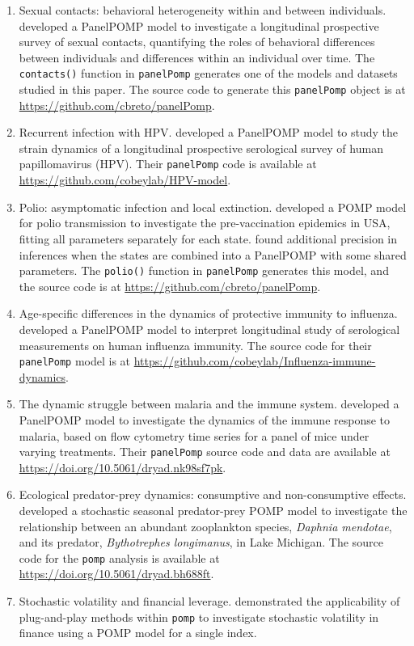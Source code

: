 \documentclass[12pt]{article}\usepackage[]{graphicx}\usepackage[table]{xcolor}
\newcommand\code{\texttt}
\newcommand\panelPomp{\texttt{panelPomp}\xspace}
\newcommand\pomp{\texttt{pomp}\xspace}
\newcommand\example[1]{ \item #1}
\begin{document}
\begin{enumerate}
\example{Sexual contacts: behavioral heterogeneity within and between individuals}.
\citet{romero-severson15} developed a PanelPOMP model to investigate a longitudinal prospective survey of sexual contacts, quantifying the roles of behavioral differences between individuals and differences within an individual over time. The \code{contacts()} function in \panelPomp generates one of the models and datasets studied in this paper.
The source code to generate this \code{panelPomp} object is at \url{https://github.com/cbreto/panelPomp}.


\example{Recurrent infection with HPV}.
\citet{ranjeva17} developed a PanelPOMP model to study the strain dynamics of a longitudinal prospective serological survey of human papillomavirus (HPV).
Their \panelPomp code is available at \url{https://github.com/cobeylab/HPV-model}.

\example{Polio: asymptomatic infection and local extinction}.
\citet{martinez-bakker15} developed a POMP model for polio transmission to investigate the pre-vaccination epidemics in USA, fitting all parameters separately for each state.
\citet{breto19} found additional precision in inferences when the states are combined into a PanelPOMP with some shared parameters.
The \code{polio()} function in \panelPomp generates this model, and the source code is at \url{https://github.com/cbreto/panelPomp}.

\example{Age-specific differences in the dynamics of protective immunity to influenza}.
\citet{ranjeva19} developed a PanelPOMP model to interpret longitudinal study of serological measurements on human influenza immunity.
The source code for their \panelPomp model is at \url{https://github.com/cobeylab/Influenza-immune-dynamics}.

\example{The dynamic struggle between malaria and the immune system}.
\citet{wale19} developed a PanelPOMP model to investigate the dynamics of the immune response to malaria, based on flow cytometry time series for a panel of mice under varying treatments. Their \code{panelPomp} source code and data are available at \url{https://doi.org/10.5061/dryad.nk98sf7pk}.

\example{Ecological predator-prey dynamics: consumptive and non-consumptive effects}.
\citet{marino19} developed a stochastic seasonal predator-prey POMP model to investigate the relationship between an abundant zooplankton species, {\it Daphnia mendotae}, and its predator, {\it Bythotrephes longimanus}, in Lake Michigan. The source code for the \code{pomp} analysis is available at \url{https://doi.org/10.5061/dryad.bh688ft}.

\example{Stochastic volatility and financial leverage}.
 \citet{breto14} demonstrated the applicability of plug-and-play methods within \pomp to investigate stochastic volatility in finance using a POMP model for a single index.

\end{enumerate}
\end{document}
